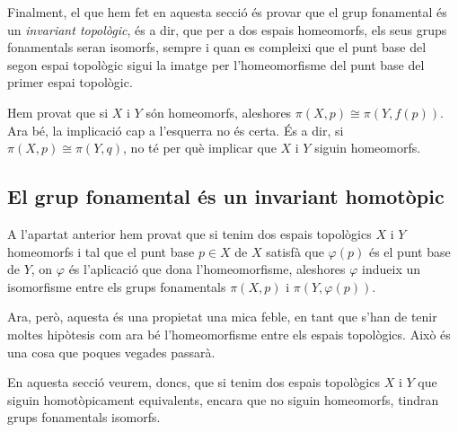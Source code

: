 \documentclass[../main.tex]{subfiles}
\begin{document}
Finalment, el que hem fet en aquesta secció és provar que el grup fonamental és un \textit{invariant topològic}, és a dir, que per a dos espais homeomorfs, els seus grups fonamentals seran isomorfs, sempre i quan es compleixi que el punt base del segon espai topològic sigui la imatge per l'homeomorfisme del punt base del primer espai topològic.

\begin{nota}
Hem provat que si $X$ i $Y$ són homeomorfs, aleshores $\pi(X,p)\cong \pi(Y,f(p))$. Ara bé, la implicació cap a l'esquerra no és certa. És a dir, si $\pi(X,p)\cong \pi(Y,q)$, no té per què implicar que $X$ i $Y$ siguin homeomorfs.
\end{nota}

\subsection{El grup fonamental és un invariant homotòpic}
A l'apartat anterior hem provat que si tenim dos espais topològics $X$ i $Y$ homeomorfs i tal que el punt base $p\in X$ de $X$ satisfà que $\varphi(p)$ és el punt base de $Y$, on $\varphi$ és l'aplicació que dona l'homeomorfisme, aleshores $\varphi$ indueix un isomorfisme entre els grups fonamentals $\pi(X,p)$ i $\pi(Y,\varphi(p))$.

Ara, però, aquesta és una propietat una mica feble, en tant que s'han de tenir moltes hipòtesis com ara bé l'homeomorfisme entre els espais topològics. Això és una cosa que poques vegades passarà.

En aquesta secció veurem, doncs, que si tenim dos espais topològics $X$ i $Y$ que siguin homotòpicament equivalents, encara que no siguin homeomorfs, tindran grups fonamentals isomorfs.
\end{document}
